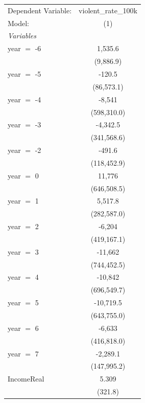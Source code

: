 
\begingroup
\centering
\begin{tabular}{lc}
   \tabularnewline \midrule \midrule
   Dependent Variable: & violent\_rate\_100k\\    
   Model:              & (1)\\  
   \midrule
   \emph{Variables}\\
   year $=$ -6         & 1,535.6\\   
                       & (9,886.9)\\   
   year $=$ -5         & -120.5\\   
                       & (86,573.1)\\   
   year $=$ -4         & -8,541\\   
                       & (598,310.0)\\   
   year $=$ -3         & -4,342.5\\   
                       & (341,568.6)\\   
   year $=$ -2         & -491.6\\   
                       & (118,452.9)\\   
   year $=$ 0          & 11,776\\   
                       & (646,508.5)\\   
   year $=$ 1          & 5,517.8\\   
                       & (282,587.0)\\   
   year $=$ 2          & -6,204\\   
                       & (419,167.1)\\   
   year $=$ 3          & -11,662\\   
                       & (744,452.5)\\   
   year $=$ 4          & -10,842\\   
                       & (696,549.7)\\   
   year $=$ 5          & -10,719.5\\   
                       & (643,755.0)\\   
   year $=$ 6          & -6,633\\   
                       & (416,818.0)\\   
   year $=$ 7          & -2,289.1\\   
                       & (147,995.2)\\   
   IncomeReal          & 5.309\\   
                       & (321.8)\\   
   \midrule

\end{tabular}
